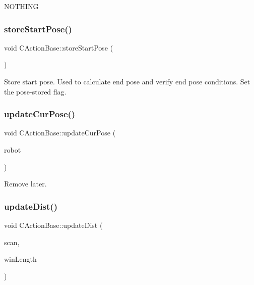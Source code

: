 N\+O\+T\+H\+I\+NG \mbox{\label{classmotion_1_1CActionBase_af660bbf31c33b1932a1a5b9219334211}} 
\subsubsection{\texorpdfstring{store\+Start\+Pose()}{storeStartPose()}}
{\footnotesize\ttfamily void C\+Action\+Base\+::store\+Start\+Pose (\begin{DoxyParamCaption}\item[{void}]{ }\end{DoxyParamCaption})}

Store start pose. Used to calculate end pose and verify end pose conditions. Set the pose-\/stored flag. \mbox{\label{classmotion_1_1CActionBase_a5fd00b2fca445758e6cbf4d5a92a5082}} 
\subsubsection{\texorpdfstring{update\+Cur\+Pose()}{updateCurPose()}}
{\footnotesize\ttfamily void C\+Action\+Base\+::update\+Cur\+Pose (\begin{DoxyParamCaption}\item[{mrpt\+::kinematics\+::\+C\+Vehicle\+Simul\+\_\+\+Diff\+Driven $\ast$}]{robot }\end{DoxyParamCaption})}

Remove later. \mbox{\label{classmotion_1_1CActionBase_ac7706bd708dc987b1da17bfa6d33a70c}} 
\subsubsection{\texorpdfstring{update\+Dist()}{updateDist()}}
{\footnotesize\ttfamily void C\+Action\+Base\+::update\+Dist (\begin{DoxyParamCaption}\item[{mrpt\+::obs\+::\+C\+Observation2\+D\+Range\+Scan $\ast$}]{scan,  }\item[{size\+\_\+t}]{win\+Length }\end{DoxyParamCaption})}


